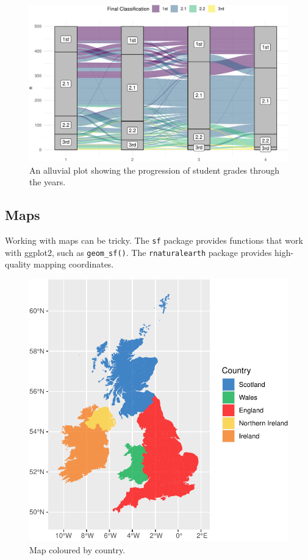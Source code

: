\documentclass[
  english,
  doc,floatsintext]{apa6}
\begin{document}
\begin{figure}

{\centering \includegraphics[width=1\linewidth]{images/alluvial-1} 

}

\caption{An alluvial plot showing the progression of student grades through the years.}\label{fig:alluvial}
\end{figure}

\hypertarget{maps}{%
\subsection{Maps}\label{maps}}

Working with maps can be tricky. The \texttt{sf} package provides functions that work with ggplot2, such as \texttt{geom\_sf()}. The \texttt{rnaturalearth} package provides high-quality mapping coordinates.

\begin{figure}

{\centering \includegraphics[width=1\linewidth]{images/map-1} 

}

\caption{Map coloured by country.}\label{fig:map}
\end{figure}
\end{document}
